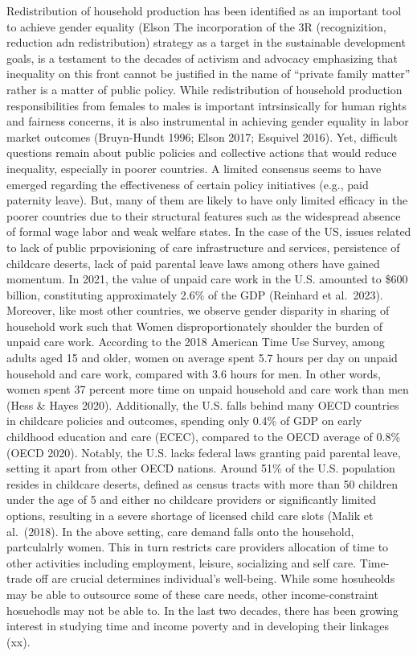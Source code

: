 \documentclass[
  11pt,
]{article}
\begin{document}
Redistribution of household production has been identified as an
important tool to achieve gender equality (Elson The incorporation of
the 3R (recognizition, reduction adn redistribution) strategy as a
target in the sustainable development goals, is a testament to the
decades of activism and advocacy emphasizing that inequality on this
front cannot be justified in the name of ``private family matter''
rather is a matter of public policy. While redistribution of household
production responsibilities from females to males is important
intrsinsically for human rights and fairness concerns, it is also
instrumental in achieving gender equality in labor market outcomes
(Bruyn-Hundt 1996; Elson 2017; Esquivel 2016). Yet, difficult questions
remain about public policies and collective actions that would reduce
inequality, especially in poorer countries. A limited consensus seems to
have emerged regarding the effectiveness of certain policy initiatives
(e.g., paid paternity leave). But, many of them are likely to have only
limited efficacy in the poorer countries due to their structural
features such as the widespread absence of formal wage labor and weak
welfare states. In the case of the US, issues related to lack of public
prpovisioning of care infrastructure and services, persistence of
childcare deserts, lack of paid parental leave laws among others have
gained momentum. In 2021, the value of unpaid care work in the U.S.
amounted to \$600 billion, constituting approximately 2.6\% of the GDP
(Reinhard et al.~2023). Moreover, like most other countries, we observe
gender disparity in sharing of household work such that Women
disproportionately shoulder the burden of unpaid care work. According to
the 2018 American Time Use Survey, among adults aged 15 and older, women
on average spent 5.7 hours per day on unpaid household and care work,
compared with 3.6 hours for men. In other words, women spent 37 percent
more time on unpaid household and care work than men (Hess \& Hayes
2020). Additionally, the U.S. falls behind many OECD countries in
childcare policies and outcomes, spending only 0.4\% of GDP on early
childhood education and care (ECEC), compared to the OECD average of
0.8\% (OECD 2020). Notably, the U.S. lacks federal laws granting paid
parental leave, setting it apart from other OECD nations. Around 51\% of
the U.S. population resides in childcare deserts, defined as census
tracts with more than 50 children under the age of 5 and either no
childcare providers or significantly limited options, resulting in a
severe shortage of licensed child care slots (Malik et al.~(2018). In
the above setting, care demand falls onto the household, partculalrly
women. This in turn restricts care providers allocation of time to other
activities including employment, leisure, socializing and self care.
Time-trade off are crucial determines individual's well-being. While
some hosuheolds may be able to outsource some of these care needs, other
income-constraint hosuehodls may not be able to. In the last two
decades, there has been growing interest in studying time and income
poverty and in developing their linkages (xx).
\end{document}
